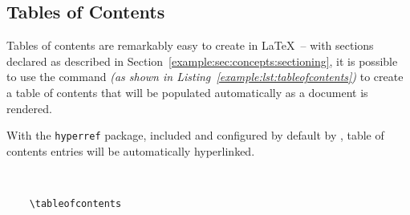 \subsection{Tables of Contents}
Tables of contents are remarkably easy to create in \LaTeX\ -- with sections declared as described in Section~\ref{example:sec:concepts:sectioning}, it is possible to use the  command \textit{(as shown in Listing~\ref{example:lst:tableofcontents})} to create a table of contents that will be populated automatically as a document is rendered.

With the \texttt{hyperref} package, included and configured by default by \uswdwmspkg{}, table of contents entries will be automatically hyperlinked.

\begin{listing}[H]
  \captionsetup{skip=\skiplistingcaptionlen}
  \begin{verbatim}
    
    
    \tableofcontents
  \end{verbatim}
  \caption{\texttt{\textbackslash tableofcontents} command example}
  \label{example:lst:tableofcontents}
\end{listing}
